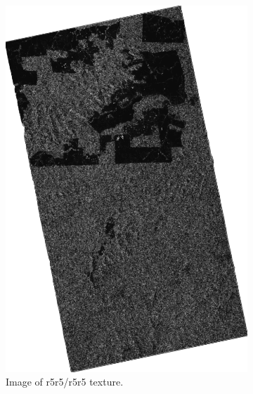 \begin{figure}[H]
\begin{subfigure}[b]{0.4\linewidth}
    \includegraphics[width=\linewidth]{Chapter4/laws_textures/r5r5_r5r5image.png}
     \caption{Image of r5r5/r5r5 texture.}
  \end{subfigure}
  \centering
  \begin{subfigure}[b]{0.4\linewidth}

\end{subfigure}
\end{figure}
